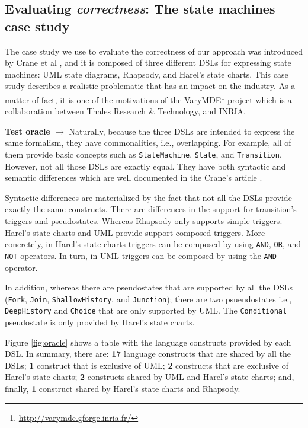 \subsection{Evaluating \textit{correctness}: The state machines case study}

The case study we use to evaluate the correctness of our approach was introduced by Crane et al \cite{Crane:2007}, and it is composed of three different DSLs for expressing state machines: UML state diagrams, Rhapsody, and Harel's state charts. This case study describes a realistic problematic that has an impact on the industry. As a matter of fact, it is one of the motivations of the VaryMDE\footnote{\url{http://varymde.gforge.inria.fr/}} project which is a collaboration between Thales Research \& Technology, and INRIA.

\textbf{Test oracle $\rightarrow$} Naturally, because the three DSLs are intended to express the same formalism, they have commonalities, i.e., overlapping. For example, all of them provide basic concepts such as \texttt{StateMachine}, \texttt{State}, and \texttt{Transition}. However, not all those DSLs are exactly equal. They have both syntactic and semantic differences which are well documented in the Crane's article \cite{Crane:2007}.

Syntactic differences are materialized by the fact that not all the DSLs provide exactly the same constructs. There are differences in the support for transition's triggers and pseudostates. Whereas Rhapsody only supports simple triggers. Harel's state charts and UML provide support composed triggers. More concretely, in Harel's state charts triggers can be composed by using \texttt{AND}, \texttt{OR}, and \texttt{NOT} operators. In turn, in UML triggers can be composed by using  the \texttt{AND} operator.

In addition, whereas there are pseudostates that are supported by all the DSLs (\texttt{Fork}, \texttt{Join}, \texttt{ShallowHistory}, and \texttt{Junction}); there are two psueudostates i.e., \texttt{DeepHistory} and \texttt{Choice} that are only supported by UML. The \texttt{Conditional} pseudostate is only provided by Harel's state charts.

Figure \ref{fig:oracle} shows a table with the language constructs provided by each DSL. In summary, there are: \textbf{17} language constructs that are shared by all the DSLs; \textbf{1} construct that is exclusive of UML; \textbf{2} constructs that are exclusive of Harel's state charts; \textbf{2} constructs shared by UML and Harel's state charts; and, finally, \textbf{1} construct shared by Harel's state charts and Rhapsody. 

